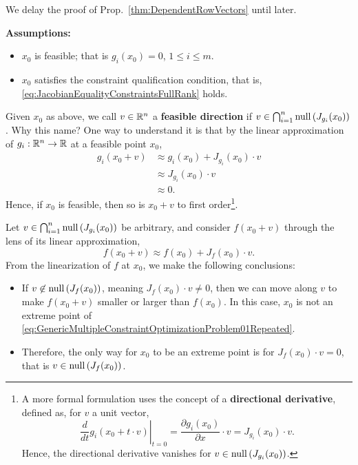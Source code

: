We delay the proof of Prop.~\ref{thm:DependentRowVectors} until later.

\textbf{Assumptions:}
\begin{itemize}
    \item $x_0$ is feasible; that is $g_i(x_0)=0$, $1 \le i \le m$.
    \item $x_0$ satisfies the constraint qualification condition, that is, \eqref{eq:JacobianEqualityConstraintsFullRank} holds.
\end{itemize}

Given $x_0$ as above, we call $v\in \mathbb R^n$ a \textbf{feasible direction} if $v \in \bigcap_{i=1}^n \mathrm{null}\left(  J_{g_i}(x_0) \right)$. Why this name? One way to understand it is that by the linear approximation of $g_i: \mathbb R^n \to \mathbb R$ at a feasible point $x_0$,
\begin{align*}
     g_i(x_0 + v) &\approx g_i(x_0) +  J_{g_i}(x_0) \cdot v\\
            & \approx J_{g_i}(x_0) \cdot v \\
            & \approx 0.
\end{align*}
Hence, if $x_0$ is feasible, then so is $x_0 + v$ to first order\footnote{A more formal formulation uses the concept of a \textbf{directional derivative}, defined as, for $v$ a unit vector, 
$$ \left. \frac{d}{dt} g_i(x_0 + t\cdot v)\right|_{t = 0} = \frac{\partial g_i(x_0)}{\partial x} \cdot v =  J_{g_i}(x_0) \cdot v.$$
Hence, the directional derivative vanishes for $v \in \mathrm{null}\left(  J_{g_i}(x_0) \right)$.}. 

Let $v \in \bigcap_{i=1}^n \mathrm{null}\left(  J_{g_i}(x_0) \right)$ be arbitrary, and consider $f(x_0 + v)$ through the lens of its linear approximation,
$$ f(x_0 + v)  \approx f(x_0) +  J_f(x_0) \cdot v. $$
From the linearization of $f$ at $x_0$, we make the following conclusions:
\begin{itemize}
    \item If $v \not \in \mathrm{null}\left( J_f(x_0) \right)$, meaning $J_{f}(x_0) \cdot v \neq 0$, then we can move along $v$ to make $f(x_0 + v)$ smaller or larger than $f(x_0)$. In this case, $x_0$ is not an extreme point of \eqref{eq:GenericMultipleConstraintOptimizationProblem01Repeated}. 
    \item Therefore, the only way for $x_0$ to be an extreme point is for $J_{f}(x_0) \cdot v = 0$, that is  $v \in \mathrm{null}\left( J_f(x_0) \right)$. 
\end{itemize}


